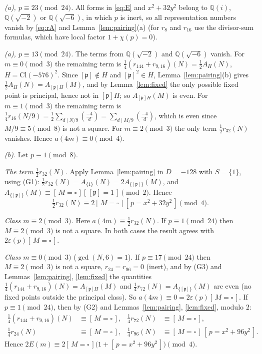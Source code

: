 \documentclass[11pt]{amsart}
\theoremstyle{definition}
\theoremstyle{remark}
\numberwithin{equation}{section}
\newcommand{\Q}{\mathbb{Q}}
\newcommand{\Cl}{\mathrm{Cl}}
\newcommand{\fp}{\mathfrak{p}}
\newcommand{\sq}{\square}
\newcommand{\ind}[1]{[\,#1\,]}
\begin{document}
\emph{(a), $p\equiv23\pmod{24}$.} All forms in \eqref{eq:E} and $x^2+32y^2$ belong to $\Q(i)$, $\Q(\sqrt{-2})$ or $\Q(\sqrt{-6})$, in which $p$ is inert, so all representation numbers vanish by \eqref{eq:rA} and Lemma~\ref{lem:pairing}(a) (for $r_8$ and $r_{16}$ use the divisor-sum formulas, which have local factor $1+\chi(p)=0$).

\emph{(a), $p\equiv13\pmod{24}$.} The terms from $\Q(\sqrt{-2})$ and $\Q(\sqrt{-6})$ vanish. For $m\equiv0\pmod 3$ the remaining term is $\frac14(r_{144}+r_{9,16})(N)=\frac12A_H(N)$, $H=\Cl(-576)^2$. Since $[\fp]\notin H$ and $[\fp]^2\in H$, Lemma~\ref{lem:pairing}(b) gives $\frac12A_H(N)=A_{[\fp]H}(M)$, and by Lemma~\ref{lem:fixed} the only possible fixed point is principal, hence not in $[\fp]H$; so $A_{[\fp]H}(M)$ is even. For $m\equiv1\pmod3$ the remaining term is $\frac14r_{16}(N/9)=\frac12\sum_{d\mid N/9}\left(\frac{-4}{d}\right)=\sum_{d\mid M/9}\left(\frac{-4}{d}\right)$, which is even since $M/9\equiv5\pmod 8$ is not a square. For $m\equiv2\pmod 3$ the only term $\frac12r_{32}(N)$ vanishes. Hence $a(4m)\equiv0\pmod4$.

\emph{(b).} Let $p\equiv1\pmod 8$.

\emph{The term $\frac12r_{32}(N)$.} Apply Lemma~\ref{lem:pairing} in $D=-128$ with $S=\{1\}$, using (G1): $\frac12r_{32}(N)=A_{\{1\}}(N)=2A_{\{[\fp]\}}(M)$, and $A_{\{[\fp]\}}(M)\equiv\ind{M=\sq}\ind{[\fp]=1}\pmod 2$. Hence
\[
\tfrac12r_{32}(N)\equiv2\ind{M=\sq}\ind{p=x^2+32y^2}\pmod 4 .
\]

\emph{Class $m\equiv2\pmod 3$.} Here $a(4m)\equiv\frac12r_{32}(N)$. If $p\equiv1\pmod{24}$ then $M\equiv2\pmod3$ is not a square. In both cases the result agrees with $2\varepsilon(p)\ind{M=\sq}$.

\emph{Class $m\equiv0\pmod 3$} ($\gcd(N,6)=1$). If $p\equiv17\pmod{24}$ then $M\equiv2\pmod 3$ is not a square, $r_{24}=r_{96}=0$ (inert), and by (G3) and Lemmas~\ref{lem:pairing}, \ref{lem:fixed} the quantities $\frac14(r_{144}+r_{9,16})(N)=A_{[\fp]H}(M)$ and $\frac14r_{72}(N)=A_{\{[\fp]\}}(M)$ are even (no fixed points outside the principal class). So $a(4m)\equiv0=2\varepsilon(p)\ind{M=\sq}$. If $p\equiv1\pmod{24}$, then by (G2) and Lemmas~\ref{lem:pairing}, \ref{lem:fixed}, modulo $2$:
\begin{align*}
\tfrac14(r_{144}+r_{9,16})(N)&\equiv\ind{M=\sq}, & \tfrac14r_{72}(N)&\equiv\ind{M=\sq},\\
\tfrac14r_{24}(N)&\equiv\ind{M=\sq}, & \tfrac14r_{96}(N)&\equiv\ind{M=\sq}\,\ind{p=x^2+96y^2}.
\end{align*}
Hence $2E(m)\equiv2\ind{M=\sq}\big(1+\ind{p=x^2+96y^2}\big)\pmod 4$.
\end{document}
